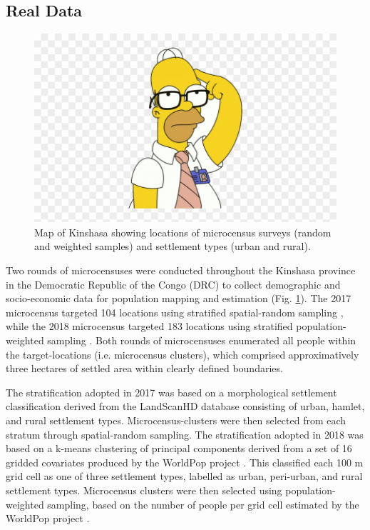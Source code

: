 \documentclass[9pt,twocolumn,twoside,lineno]{pnas-new}
\begin{document}
{	\subsection{Real Data}
	
	\begin{figure}
		\centering
		\includegraphics[width=1\linewidth]{doh.png}
		\caption{Map of Kinshasa showing locations of microcensus surveys (random and weighted samples) and settlement types (urban and rural).}
		\label{fig:kinshasa}
	\end{figure}
	
	Two rounds of microcensuses were conducted throughout the Kinshasa province in the Democratic Republic of the Congo (DRC) to collect demographic and socio-economic data for population mapping and estimation (Fig. \ref{fig:kinshasa}). The 2017 microcensus targeted 104 locations using stratified spatial-random sampling \cite{}, while the 2018 microcensus targeted 183 locations using stratified population-weighted sampling \cite{}. Both rounds of microcensuses enumerated all people within the target-locations (i.e. microcensus clusters), which comprised approximatively three hectares of settled area within clearly defined boundaries. 
	
	The stratification adopted in 2017 was based on a morphological settlement classification derived from the LandScanHD database \cite{} consisting of urban, hamlet, and rural settlement types. Microcensus-clusters were then selected from each stratum through spatial-random sampling. The stratification adopted in 2018 was based on a k-means clustering of principal components derived from a set of 16 gridded covariates produced by the WorldPop project \cite{}. This classified each 100 m grid cell as one of three settlement types, labelled as urban, peri-urban, and rural settlement types. Microcensus clusters were then selected using population-weighted sampling, based on the number of people per grid cell estimated by the WorldPop project \cite{}.
	
}
\end{document}
